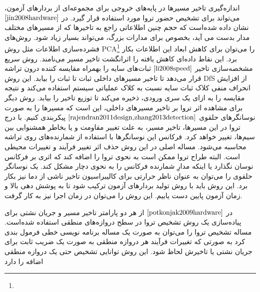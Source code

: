 اندازه‌گیری تاخیر مسیرها در پایه‌های خروجی برای مجموعه‌ای از بردارهای آزمون، می‌تواند برای تشخیص حضور تروا مورد استفاده قرار گیرد. در $\cite{jin2008hardware}$ نشان داده شده‌است که حجم چنین اطلاعاتی راجع به تاخیرها که از مسیرهای مختلف مدار بدست می آید، بخصوص برای مدارات بزرگ، می‌تواند بسیار زیاد شود. روش‌های فشرده‌سازی اطلاعات مثل روش PCA\footnote{} را می‌توان برای کاهش ابعاد این اطلاعات بکار برد. این نقاط داده‌ای کاهش یافته را اثرانگشت تاخیر مسیر می‌نامند.
روش سریع مشخصه‌سازی تاخیر $\cite{li2008speed}$ ثبات‌های سایه را بهمراه مقایسه کننده درون تراشه قرار می‌دهد تا تاخیر مسیرهای داخلی ثبات تا ثبات را بیابد. این روش DfS از افزایش انحراف منفی کلاک ثبات سایه نسبت به کلاک عملیاتی سیستم استفاده می‌کند و نتیجه مقایسه را به ازای یک سری ورودی، ذخیره می‌کند تا توزیع تاخیر را بیابد. 
روش دیگر برای مشاهده اثر تروا بر تاخیر مسیرهای داخلی، این است که مسیرها را به صورت نوسانگرهای حلقوی  
$\cite{rajendran2011design,zhang2013detection}$
پیکربندی کنیم. با درج تروا در این مسیرها، تاخیر مسیر، به علت تغییر مقاومت و یا بخاطر همشنوایی بین سیم‌ها، تغییر خواهد کرد. فرکانس این نوسانگرها با استفاده از شمارنده‌های روی تراشه محاسبه می‌شود. مساله اصلی در این روش حذف اثر تغییر فرآیند و تغییرات محیطی است. البته طراح تروا ممکن است به نحوی تروا را اضافه کند که اثری بر فرکانس نوسان نگذارد یا اینکه مدارِ شمارنده فرکانس را به نحوی دچار مشکل کند. یک نوسانگر حلقوی را می‌توان به عنوان ناظر حرارتی برای کالیبراسیون تاخیر ناشی از دما نیز بکار برد. این روش باید با روش تولید بردارهای آزمون ترکیب شود تا به پوشش دهی بالا و زمان آزمون پایین دست یابیم. این روش را می‌توان در زمان اجرا نیز به کار گرفت.

در $\cite{potkonjak2009hardware}$ از هر دو پارامتر تاخیر مسیر و جریان نشتی برای پیاده‌سازی یک روش تشخیص تروا در سطح دروازه‌های منطقی استفاده شده‌است. مساله تشخیص تروا را می‌توان به صورت یک مساله برنامه نویسی خطی فرمول بندی کرد به صورتی که تغییرات فرآیند هر دروازه منطقی به صورت یک ضریب ثابت برای جریان نشتی یا تاخیرش لحاظ شود. این روش توانایی تشخیص حتی یک دروازه منطقی اضافه را دارد
